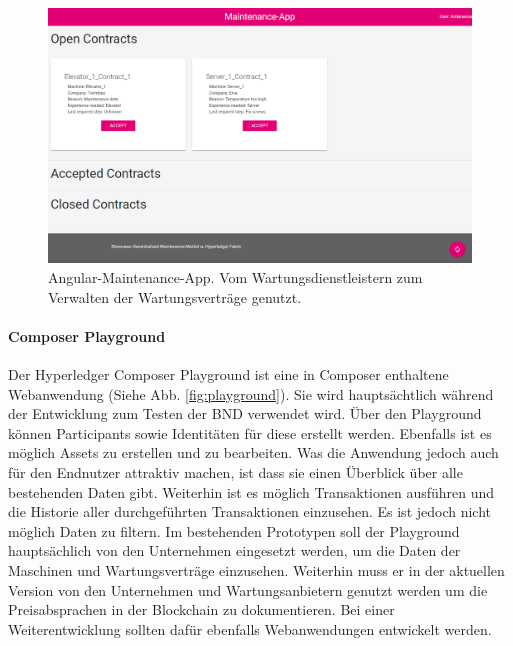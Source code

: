 \begin{figure}[htb]
    \centering
      \includegraphics[width=1.0\textwidth,angle=0]{images/maintenance-app}
       \caption{Angular-Maintenance-App. Vom Wartungsdienstleistern zum Verwalten der Wartungsverträge genutzt.}
      \label{fig:maintenance-app}
\end{figure}

\paragraph{Composer Playground}
Der Hyperledger Composer Playground ist eine in Composer enthaltene Webanwendung (Siehe Abb. \ref{fig:playground}). Sie wird hauptsächtlich während der Entwicklung zum Testen der BND verwendet wird. Über den Playground können Participants sowie Identitäten für diese erstellt werden. Ebenfalls ist es möglich Assets zu erstellen und zu bearbeiten. Was die Anwendung jedoch auch für den Endnutzer attraktiv machen, ist dass sie einen Überblick über alle bestehenden Daten gibt. Weiterhin ist es möglich Transaktionen ausführen und die Historie aller durchgeführten Transaktionen einzusehen. Es ist jedoch nicht möglich Daten zu filtern. Im bestehenden Prototypen soll der Playground hauptsächlich von den Unternehmen eingesetzt werden, um die Daten der Maschinen und Wartungsverträge einzusehen. Weiterhin muss er in der aktuellen Version von den Unternehmen und Wartungsanbietern genutzt werden um die Preisabsprachen in der Blockchain zu dokumentieren. Bei einer Weiterentwicklung sollten dafür ebenfalls Webanwendungen entwickelt werden.

